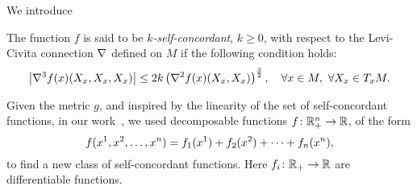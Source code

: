 We introduce

\begin{definition}\label{d1}
\rm The function $f$ is said to be {\it $k$-self-concordant}, $k\geq
0$, with respect to the Levi-Civita connection $\nabla$ defined on $M$
if the following condition holds:
$$\left|\nabla^3f(x)(X_x,X_x,X_x)\right|\leq 2k\left(\nabla^2f(x)(X_x,X_x)\right)^{3\over 2},\quad\forall x\in M,~\forall X_x\in T_xM.$$
\end{definition}

\begin{remark}{\rm
Given the metric $g$, and inspired by the linearity of the set of
self-concordant functions, in our work~\cite{bp1}, we used
decomposable functions $f\colon \mathbb R_+^n\to\mathbb R$, of the form
\begin{equation}\label{e1}
f(x^1,x^2,\ldots,x^n)=f_1(x^1)+f_2(x^2)+\cdots+f_n(x^n),
\end{equation}
to find a new class of self-concordant functions. Here $f_i\colon
\mathbb R_+\to\mathbb R$ are differentiable functions}.
\end{remark}
